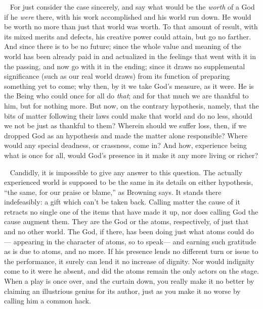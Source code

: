 \documentclass[12pt]{article}
\newcounter{wjparagraph}[section]
\newcommand*{\wjparagraph}{\stepcounter{wjparagraph}~\marginpar{\tiny\arabic{wjparagraph} }}
\begin{document}
\wjparagraph
For just consider the case sincerely, and say what would be the \emph{worth} of a God if he \emph{were} there, with his work accomplished and his world run down. He would be worth no more than just that world was worth. To that amount of result, with its mixed merits and defects, his creative power could attain, but go no farther. And since there is to be no future; since the whole value and meaning of the world has been already paid in and actualized in the feelings that went with it in the passing, and now go with it in the ending; since it draws no supplemental significance (such as our real world draws) from its function of preparing something yet to come; why then, by it we take God's measure, as it were. He is the Being who could once for all do \emph{that}; and for that much we are thankful to him, but for nothing more. But now, on the contrary hypothesis, namely, that the bits of matter following their laws could make that world and do no less, should we not be just as thankful to them? Wherein should we suffer loss, then, if we dropped God as an hypothesis and made the matter alone responsible? Where would any special deadness, or crassness, come in? And how, experience being what is once for all, would God's presence in it make it any more living or richer?

\wjparagraph
Candidly, it is impossible to give any answer to this question. The actually experienced world is supposed to be the same in its details on either hypothesis, ``the same, for our praise or blame,'' as Browning says. It stands there indefeasibly: a gift which can't be taken back. Calling matter the cause of it retracts no single one of the items that have made it up, nor does calling God the cause augment them. They are the God or the atoms, respectively, of just that and no other world. The God, if there, has been doing just what atoms could do--- appearing in the character of atoms, so to speak--- and earning such gratitude as is due to atoms, and no more. If his presence lends no different turn or issue to the performance, it surely can lend it no increase of dignity. Nor would indignity come to it were he absent, and did the atoms remain the only actors on the stage. When a play is once over, and the curtain down, you really make it no better by claiming an illustrious genius for its author, just as you make it no worse by calling him a common hack.
\end{document}
